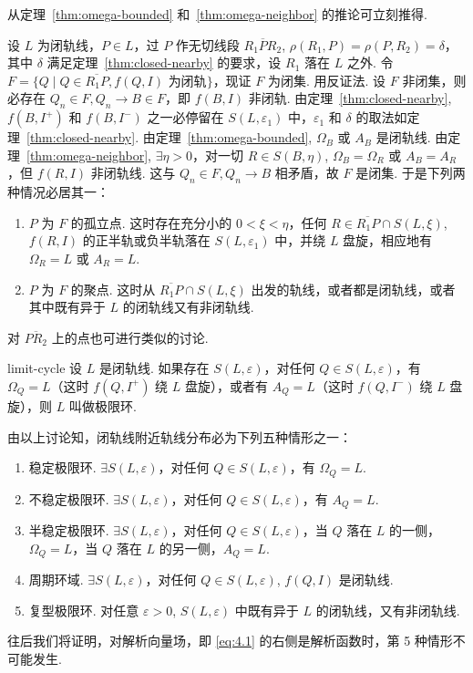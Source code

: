 从定理~\ref{thm:omega-bounded} 和~\ref{thm:omega-neighbor} 的推论可立刻推得.

设 $L$ 为闭轨线，$P \in L$，过 $P$ 作无切线段 $\overline{R_1PR_2}$, $\rho(R_1, P) = \rho(P, R_2) = \delta$，其中 $\delta$ 满足定理~\ref{thm:closed-nearby} 的要求，设 $R_1$ 落在 $L$ 之外. 令 $F = \{Q \mid Q \in \overline{R_1P}, f(Q, I) \text{ 为闭轨}\}$，现证 $F$ 为闭集. 用反证法. 设 $F$ 非闭集，则必存在 $Q_n \in F, Q_n \to B \in F$，即 $f(B, I)$ 非闭轨. 由定理~\ref{thm:closed-nearby}, $f(B, I^+)$ 和 $f(B, I^-)$ 之一必停留在 $S(L, \varepsilon_1)$ 中，$\varepsilon_1$ 和 $\delta$ 的取法如定理~\ref{thm:closed-nearby}. 由定理~\ref{thm:omega-bounded}, $\Omega_B$ 或 $A_B$ 是闭轨线. 由定理~\ref{thm:omega-neighbor}, $\exists \eta > 0$，对一切 $R \in S(B, \eta)$, $\Omega_B = \Omega_R$ 或 $A_B = A_R$，但 $f(R, I)$ 非闭轨线. 这与 $Q_n \in F, Q_n \to B$ 相矛盾，故 $F$ 是闭集. 于是下列两种情况必居其一：
\begin{enumerate}
\item $P$ 为 $F$ 的孤立点. 这时存在充分小的 $0 < \xi < \eta$，任何 $R \in \overline{R_1P} \cap S(L, \xi)$, $f(R, I)$ 的正半轨或负半轨落在 $S(L, \varepsilon_1)$ 中，并绕 $L$ 盘旋，相应地有 $\Omega_R = L$ 或 $A_R = L$.
\item $P$ 为 $F$ 的聚点. 这时从 $\overline{R_1P} \cap S(L, \xi)$ 出发的轨线，或者都是闭轨线，或者其中既有异于 $L$ 的闭轨线又有非闭轨线.
\end{enumerate}
对 $\overline{PR_2}$ 上的点也可进行类似的讨论.

\begin{definition}{}{limit-cycle}
设 $L$ 是闭轨线. 如果存在 $S(L, \varepsilon)$，对任何 $Q \in S(L, \varepsilon)$，有 $\Omega_Q = L$（这时 $f(Q, I^+)$ 绕 $L$ 盘旋），或者有 $A_Q = L$（这时 $f(Q, I^-)$ 绕 $L$ 盘旋），则 $L$ 叫做极限环.
\end{definition}

由以上讨论知，闭轨线附近轨线分布必为下列五种情形之一：
\begin{enumerate}
\item 稳定极限环. $\exists S(L, \varepsilon)$，对任何 $Q \in S(L, \varepsilon)$，有 $\Omega_Q = L$.
\item 不稳定极限环. $\exists S(L, \varepsilon)$，对任何 $Q \in S(L, \varepsilon)$，有 $A_Q = L$.
\item 半稳定极限环. $\exists S(L, \varepsilon)$，对任何 $Q \in S(L, \varepsilon)$，当 $Q$ 落在 $L$ 的一侧，$\Omega_Q = L$，当 $Q$ 落在 $L$ 的另一侧，$A_Q = L$.
\item 周期环域. $\exists S(L, \varepsilon)$，对任何 $Q \in S(L, \varepsilon)$, $f(Q, I)$ 是闭轨线.
\item 复型极限环. 对任意 $\varepsilon > 0$, $S(L, \varepsilon)$ 中既有异于 $L$ 的闭轨线，又有非闭轨线.
\end{enumerate}
往后我们将证明，对解析向量场，即 \eqref{eq:4.1} 的右侧是解析函数时，第 5 种情形不可能发生.

